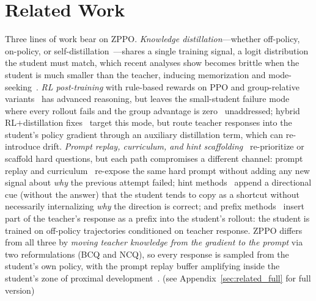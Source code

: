 \section{Related Work}
\label{sec:related}
Three lines of work bear on ZPPO. \emph{Knowledge distillation}—whether off-policy, on-policy, or self-distillation~\citep{gou2021knowledge,ko2024distillm,agarwal2024policy,lu2025onpolicydistillation,zelikman2022star,shenfeld2026self}—shares a single training signal, a logit distribution the student must match, which recent analyses show becomes brittle when the student is much smaller than the teacher, inducing memorization and mode-seeking~\citep{kim2026does,li2026rethinking,song2026survey}. \emph{RL post-training} with rule-based rewards on PPO and group-relative variants~\citep{schulman2017proximal,shao2024deepseekmath,yu2025dapo,guo2025deepseek} has advanced reasoning, but leaves the small-student failure mode where every rollout fails and the group advantage is zero~\citep{yu2025dapo} unaddressed; hybrid RL$+$distillation fixes~\citep{xu2025kdrl,xu2026rlkd} target this mode, but route teacher responses into the student's policy gradient through an auxiliary distillation term, which can re-introduce drift. \emph{Prompt replay, curriculum, and hint scaffolding}~\citep{zhan2025exgrpo,zhang2025rlep,zhang2025clpo,zhang2025stephint,zhang2025bread,li2025staying} re-prioritize or scaffold hard questions, but each path compromises a different channel: prompt replay and curriculum~\citep{zhan2025exgrpo,zhang2025rlep,zhang2025clpo} re-expose the same hard prompt without adding any new signal about \emph{why} the previous attempt failed; hint methods~\citep{li2025staying} append a directional cue (without the answer) that the student tends to copy as a shortcut without necessarily internalizing \emph{why} the direction is correct; and prefix methods~\citep{zhang2025stephint,zhang2025bread} insert part of the teacher's response as a prefix into the student's rollout: the student is trained on off-policy trajectories conditioned on teacher response. ZPPO differs from all three by \emph{moving teacher knowledge from the gradient to the prompt} via two reformulations (BCQ and NCQ), so every response is sampled from the student's own policy, with the prompt replay buffer amplifying inside the student's zone of proximal development~\citep{vygotsky1978mind}. (see Appendix~\ref{sec:related_full} for full version)

